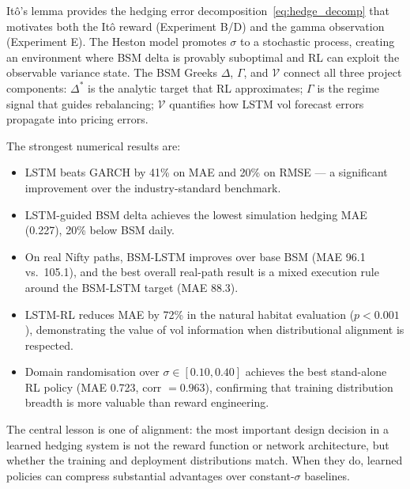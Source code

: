 \documentclass[12pt,a4paper]{article}
\begin{document}
It\^{o}'s lemma provides the hedging error decomposition~\eqref{eq:hedge_decomp}
that motivates both the It\^{o} reward (Experiment B/D) and the gamma observation
(Experiment E).  The Heston model promotes $\sigma$ to a stochastic process,
creating an environment where BSM delta is provably suboptimal and RL can
exploit the observable variance state.  The BSM Greeks $\Delta$, $\Gamma$,
and $\mathcal{V}$ connect all three project components: $\Delta^*$ is the
analytic target that RL approximates; $\Gamma$ is the regime signal that guides
rebalancing; $\mathcal{V}$ quantifies how LSTM vol forecast errors propagate
into pricing errors.

The strongest numerical results are:
\begin{itemize}[leftmargin=*]
  \item LSTM beats GARCH by 41\% on MAE and 20\% on RMSE --- a significant
        improvement over the industry-standard benchmark.
  \item LSTM-guided BSM delta achieves the lowest simulation hedging MAE
        (0.227), 20\% below BSM daily.
  \item On real Nifty paths, BSM-LSTM improves over base BSM (MAE 96.1 vs.\
        105.1), and the best overall real-path result is a mixed execution
        rule around the BSM-LSTM target (MAE 88.3).
  \item LSTM-RL reduces MAE by 72\% in the natural habitat evaluation
        ($p<0.001$), demonstrating the value of vol information when
        distributional alignment is respected.
  \item Domain randomisation over $\sigma\in[0.10,0.40]$ achieves the
        best stand-alone RL policy (MAE 0.723, corr $= 0.963$), confirming
        that training distribution breadth is more valuable than reward
        engineering.
\end{itemize}

The central lesson is one of alignment: the most important design decision in
a learned hedging system is not the reward function or network architecture,
but whether the training and deployment distributions match.  When they do,
learned policies can compress substantial advantages over constant-$\sigma$
baselines.
\end{document}
